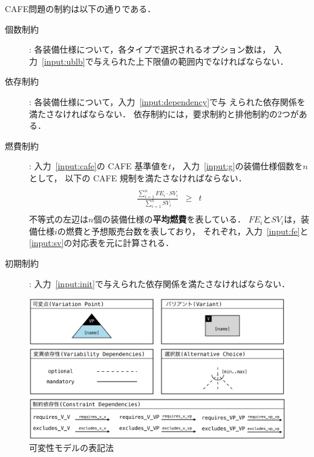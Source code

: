 CAFE問題の制約は以下の通りである．
\begin{description}
\item[個数制約]: 各装備仕様について，各タイプで選択されるオプション数は，
  入力~\ref{input:ublb}で与えられた上下限値の範囲内でなければならない．
\item[依存制約]: 各装備仕様について，入力~\ref{input:dependency}で与
  えられた依存関係を満たさなければならない．
  依存制約には，要求制約と排他制約の2つがある．
\item[燃費制約]: 入力~\ref{input:cafe}の CAFE 基準値を$t$，
  入力~\ref{input:g}の装備仕様個数を$n$として，
  以下の CAFE 規制を満たさなければならない．
  \[
    \begin{array}{lcr}
      & & \\
      \displaystyle\frac{\sum_{i=1}^{n} FE_{i}\cdot SV_{i}}{\sum_{i=1}^{n} SV_{i}}
      &
        \geq 
      &
        t \\
      & & 
    \end{array}
  \]
  不等式の左辺は$n$個の装備仕様の\textbf{平均燃費}を表している．
  $FE_{i}$と$SV_{i}$は，装備仕様$i$の燃費と予想販売台数を表しており，
  それぞれ，入力~\ref{input:fe}と\ref{input:sv}の対応表を元に計算される．
\item[初期制約]:
  入力~\ref{input:init}で与えられた依存関係を満たさなければならない．
\end{description}

\begin{figure}[tb]
  \centering
  \includegraphics[width=\linewidth]{images/notation.eps}
  \caption{可変性モデルの表記法\cite{Pohl05:sple}}
  \label{fig:ovm_notation}
\end{figure}

